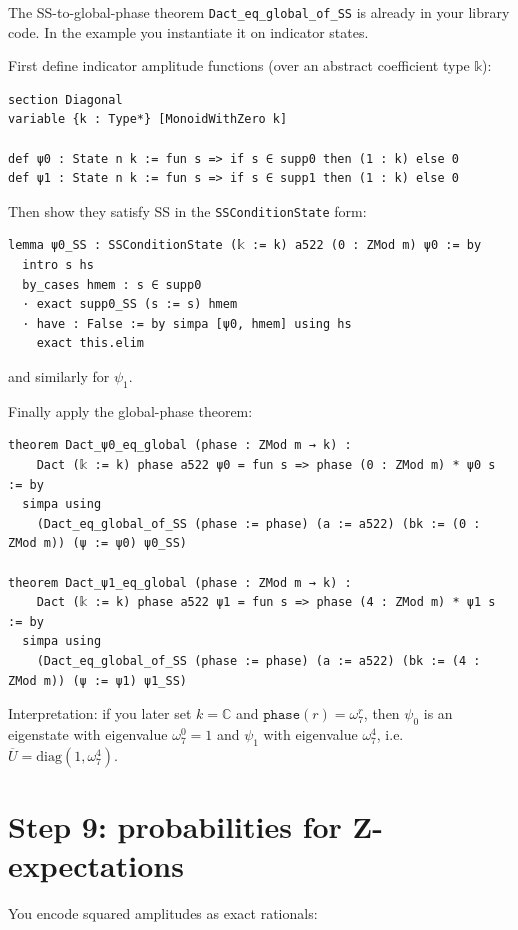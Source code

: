 \documentclass[11pt]{article}
\begin{document}
The SS-to-global-phase theorem \texttt{Dact\_eq\_global\_of\_SS} is already in your library code. In the example you instantiate it on indicator states.

First define indicator amplitude functions (over an abstract coefficient type \(\mathbb{k}\)):

\begin{lstlisting}
section Diagonal
variable {k : Type*} [MonoidWithZero k]

def ψ0 : State n k := fun s => if s ∈ supp0 then (1 : k) else 0
def ψ1 : State n k := fun s => if s ∈ supp1 then (1 : k) else 0
\end{lstlisting}

Then show they satisfy SS in the \texttt{SSConditionState} form:

\begin{lstlisting}
lemma ψ0_SS : SSConditionState (𝕜 := k) a522 (0 : ZMod m) ψ0 := by
  intro s hs
  by_cases hmem : s ∈ supp0
  · exact supp0_SS (s := s) hmem
  · have : False := by simpa [ψ0, hmem] using hs
    exact this.elim
\end{lstlisting}

and similarly for \(\psi_1\).

Finally apply the global-phase theorem:

\begin{lstlisting}
theorem Dact_ψ0_eq_global (phase : ZMod m → k) :
    Dact (𝕜 := k) phase a522 ψ0 = fun s => phase (0 : ZMod m) * ψ0 s := by
  simpa using
    (Dact_eq_global_of_SS (phase := phase) (a := a522) (bk := (0 : ZMod m)) (ψ := ψ0) ψ0_SS)

theorem Dact_ψ1_eq_global (phase : ZMod m → k) :
    Dact (𝕜 := k) phase a522 ψ1 = fun s => phase (4 : ZMod m) * ψ1 s := by
  simpa using
    (Dact_eq_global_of_SS (phase := phase) (a := a522) (bk := (4 : ZMod m)) (ψ := ψ1) ψ1_SS)
\end{lstlisting}

Interpretation:
if you later set \(k=\mathbb{C}\) and \(\texttt{phase}(r)=\omega_7^{r}\),
then \(\psi_0\) is an eigenstate with eigenvalue \(\omega_7^0=1\) and \(\psi_1\) with eigenvalue \(\omega_7^4\), i.e. \(\overline U=\mathrm{diag}(1,\omega_7^4)\).

\section*{Step 9: probabilities for Z-expectations}

You encode squared amplitudes as exact rationals:
\end{document}
